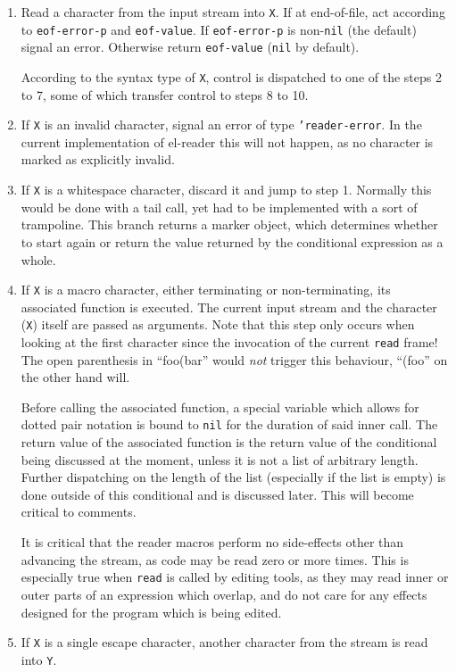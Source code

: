\documentclass[a4paper,10pt,twoside]{report}
\newcommand{\elr}{el-reader}
\newcommand{\fun}[1]{\texttt{#1}}
\newcommand{\Read}{\fun{read}}
\begin{document}
\begin{enumerate}
\item Read a character from the input stream into \texttt{X}.  If at
  end-of-file, act according to \texttt{eof-error-p} and \texttt{eof-value}.
  If \texttt{eof-error-p} is non-\texttt{nil} (the default) signal an error.
  Otherwise return \texttt{eof-value} (\texttt{nil} by default).

  According to the syntax type of \texttt{X}, control is dispatched to one of
  the steps 2 to 7, some of which transfer control to steps 8 to 10.
\item If \texttt{X} is an invalid character, signal an error of type
  \texttt{'reader-error}.  In the current implementation of \elr{} this will not
  happen, as no character is marked as explicitly invalid.
\item If \texttt{X} is a whitespace character, discard it and jump to step 1.
  Normally this would be done with a tail call, yet had to be implemented with a
  sort of trampoline.  This branch returns a marker object, which determines
  whether to start again or return the value returned by the conditional
  expression as a whole.
\item If \texttt{X} is a macro character, either terminating or non-terminating,
  its associated function is executed.  The current input stream and the
  character (\texttt{X}) itself are passed as arguments.  Note that this step
  only occurs when looking at the first character since the invocation of the
  current \Read{} frame!  The open parenthesis in ``foo(bar'' would \emph{not}
  trigger this behaviour, ``(foo'' on the other hand will.

  Before calling the associated function, a special variable which allows for
  dotted pair notation is bound to \texttt{nil} for the duration of said inner
  call.  The return value of the associated function is the return value of the
  conditional being discussed at the moment, unless it is not a list of
  arbitrary length.  Further dispatching on the length of the list (especially
  if the list is empty) is done outside of this conditional and is discussed
  later.  This will become critical to comments.

  It is critical that the reader macros perform no side-effects other than
  advancing the stream, as code may be read zero or more times.  This is
  especially true when \Read{} is called by editing tools, as they may read
  inner or outer parts of an expression which overlap, and do not care for any
  effects designed for the program which is being edited.
\item If \texttt{X} is a single escape character, another character from
  the stream is read into \texttt{Y}.


\end{enumerate}
\end{document}
